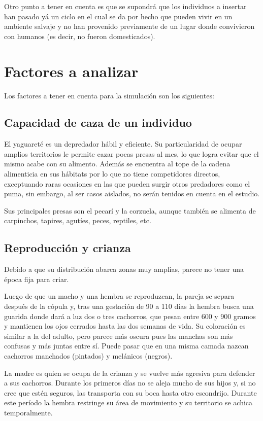     Otro punto a tener en cuenta es que se supondrá que los individuos a insertar han pasado yá un ciclo en el cual se da por hecho que pueden vivir en un ambiente salvaje y no han provenido previamente de un lugar donde convivieron con humanos (es decir, no fueron domesticados).

\section{Factores a analizar}
    Los factores a tener en cuenta para la simulación son los siguientes:
    
   \subsection{Capacidad de caza de un individuo}
    El yaguareté es un depredador hábil y eficiente. Su particularidad de ocupar amplios territorios le permite cazar pocas presas al mes, lo que logra evitar que el mismo acabe con su alimento. Además se encuentra al tope de la cadena alimenticia en sus hábitats por lo que no tiene competidores directos, exceptuando raras ocasiones en las que pueden surgir otros predadores como el puma, sin embargo, al ser casos aislados, no serán tenidos en cuenta en el estudio.
    
    Sus principales presas son el pecarí y la corzuela, aunque también se alimenta de carpinchos, tapires, agutíes, peces, reptiles, etc.
    
    \subsection{Reproducción y crianza}
    Debido a que su distribución abarca zonas muy amplias, parece no tener una época fija para criar.
    
    Luego de que un macho y una hembra se reproduzcan, la pareja se separa después de la cópula y, tras una gestación de 90 a 110 días la hembra busca una guarida donde dará a luz dos o tres cachorros, que pesan entre 600 y 900 gramos y mantienen los ojos cerrados hasta las dos semanas de vida. Su coloración es similar a la del adulto, pero parece más oscura pues las manchas son más confusas y más juntas entre sí. Puede pasar que en una misma camada nazcan cachorros manchados (pintados) y melánicos (negros).
    
    La madre es quien se ocupa de la crianza y se vuelve más agresiva para defender a sus cachorros. Durante los primeros días no se aleja mucho de sus hijos y, si no cree que estén seguros, las transporta con su boca hasta otro escondrijo. Durante este período la hembra restringe su área de movimiento y su territorio se achica temporalmente.
    
